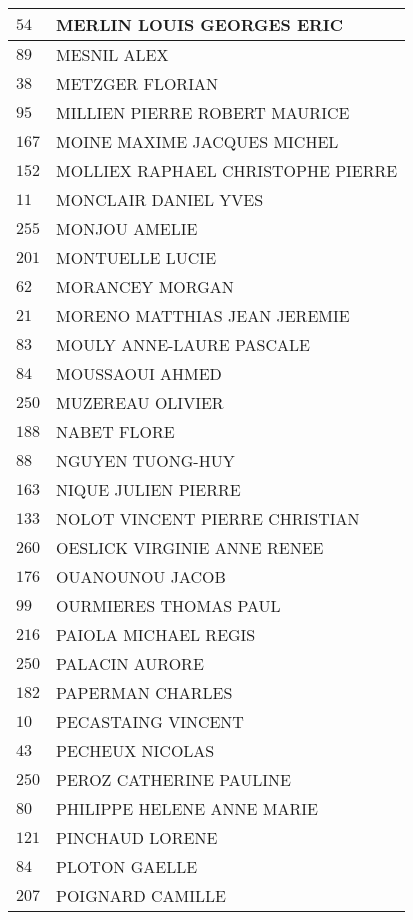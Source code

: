 \begin{xltabular}{\linewidth}{|l|X|}
    \hline
    $54$ & MERLIN LOUIS GEORGES ERIC \\
    \hline
    $89$ & MESNIL ALEX \\
    \hline
    $38$ & METZGER FLORIAN \\
    \hline
    $95$ & MILLIEN PIERRE ROBERT MAURICE \\
    \hline
    $167$ & MOINE MAXIME JACQUES MICHEL \\
    \hline
    $152$ & MOLLIEX RAPHAEL CHRISTOPHE PIERRE \\
    \hline
    $11$ & MONCLAIR DANIEL YVES \\
    \hline
    $255$ & MONJOU AMELIE \\
    \hline
    $201$ & MONTUELLE LUCIE \\
    \hline
    $62$ & MORANCEY MORGAN \\
    \hline
    $21$ & MORENO MATTHIAS JEAN JEREMIE \\
    \hline
    $83$ & MOULY ANNE-LAURE PASCALE \\
    \hline
    $84$ & MOUSSAOUI AHMED \\
    \hline
    $250$ & MUZEREAU OLIVIER \\
    \hline
    $188$ & NABET FLORE \\
    \hline
    $88$ & NGUYEN TUONG-HUY \\
    \hline
    $163$ & NIQUE JULIEN PIERRE \\
    \hline
    $133$ & NOLOT VINCENT PIERRE CHRISTIAN \\
    \hline
    $260$ & OESLICK VIRGINIE ANNE RENEE \\
    \hline
    $176$ & OUANOUNOU JACOB \\
    \hline
    $99$ & OURMIERES THOMAS PAUL \\
    \hline
    $216$ & PAIOLA MICHAEL REGIS \\
    \hline
    $250$ & PALACIN AURORE \\
    \hline
    $182$ & PAPERMAN CHARLES \\
    \hline
    $10$ & PECASTAING VINCENT \\
    \hline
    $43$ & PECHEUX NICOLAS \\
    \hline
    $250$ & PEROZ CATHERINE PAULINE \\
    \hline
    $80$ & PHILIPPE HELENE ANNE MARIE \\
    \hline
    $121$ & PINCHAUD LORENE \\
    \hline
    $84$ & PLOTON GAELLE \\
    \hline
    $207$ & POIGNARD CAMILLE \\

\end{xltabular}
